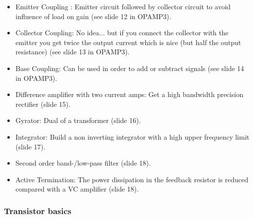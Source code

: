 			\begin{itemize}
				\setlength{\itemsep}{-4pt}
				\item Emitter Coupling : Emitter circuit followed by collector circuit to avoid influence of load on gain (see slide 12 in OPAMP3).
				\item Collector Coupling: No idea... but if you connect the collector with the emitter you get twice the output current which is nice (but half the output resistance) (see slide 13 in OPAMP3).
				\item Base Coupling: Can be used in order to add or subtract signals (see slide 14 in OPAMP3).
				\item Difference amplifier with two current amps: Get a high bandwidth precision rectifier (slide 15).
				\item Gyrator: Dual of a transformer (slide 16).
				\item Integrator: Build a non inverting integrator with a high upper frequency limit (slide 17).
				\item Second order band-/low-pass filter (slide 18).
				\item Active Termination: The power dissipation in the feedback resistor is reduced compared with a VC amplifier (slide 18).
			\end{itemize}
	
	\subsubsection{Transistor basics}
			
